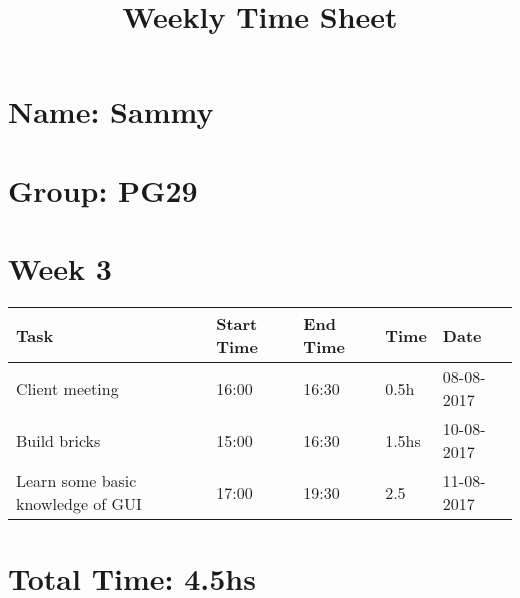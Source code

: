 \documentclass[14]{article}
\title{Weekly Time Sheet}
\begin{document}
\section*{Name: Sammy}
\vspace*{10pt}
\section*{Group: PG29}
\vspace*{10pt}
\section*{Week 3}
\vspace*{10pt}

\begin{tabular}{|l|l|l|l|l|}\hline
Task & Start Time & End Time & Time & Date \\ \hline
Client meeting & 16:00 & 16:30 & 0.5h & 08-08-2017 \\ \hline
Build bricks & 15:00 & 16:30 & 1.5hs & 10-08-2017 \\ \hline
Learn some basic knowledge of GUI & 17:00 & 19:30 & 2.5 & 11-08-2017 \\ \hline
\end{tabular}

\vspace*{10pt}
\section*{Total Time: 4.5hs}
\end{document}
